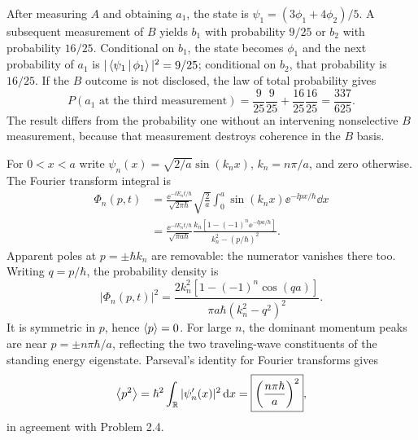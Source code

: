 After measuring $A$ and obtaining $a_1$,
the state is $\psi_1=(3\phi_1+4\phi_2)/5$.
A subsequent measurement of $B$ yields
$b_1$ with probability $9/25$ or $b_2$
with probability $16/25$.
Conditional on $b_1$, the state becomes
$\phi_1$ and the next probability of
$a_1$ is $|\left\langle\psi_1\,\middle|\,\phi_1\right\rangle|^2=9/25$;
conditional on $b_2$, that probability is
$16/25$.
If the $B$ outcome is not disclosed,
the law of total probability gives
\begin{equation}
\boxed{P(a_1\text{ at the third measurement})=
\frac9{25}\frac9{25}+
\frac{16}{25}\frac{16}{25}
=\frac{337}{625}}.
\end{equation}
The result differs from the probability one
without an intervening nonselective $B$ measurement,
because that measurement destroys coherence
in the $B$ basis.

For $0<x<a$ write
$\psi_n(x)=\sqrt{2/a}\sin(k_nx)$,
$k_n=n\pi/a$, and zero otherwise.
The Fourier transform integral is
\begin{align}
\Phi_n(p,t)&=\frac{\ee^{-\ii E_nt/\hbar}}
{\sqrt{2\pi\hbar}}\sqrt{\frac2a}
\int_0^a\sin(k_nx)\ee^{-\ii px/\hbar}\dd x\\
&=\boxed{
\frac{\ee^{-\ii E_nt/\hbar}}{\sqrt{\pi a\hbar}}
\frac{k_n[1-(-1)^n\ee^{-\ii pa/\hbar}]}
{k_n^2-(p/\hbar)^2}}.
\end{align}
Apparent poles at $p=\pm\hbar k_n$ are
removable: the numerator vanishes there too.
Writing $q=p/\hbar$, the probability density is
\begin{equation}
\boxed{|\Phi_n(p,t)|^2=
\frac{2k_n^2[1-(-1)^n\cos(qa)]}
{\pi a\hbar(k_n^2-q^2)^2}}.
\end{equation}
It is symmetric in $p$, hence $\left\langle p\right\rangle=0$.
For large $n$, the dominant momentum peaks
are near $p=\pm n\pi\hbar/a$, reflecting the
two traveling-wave constituents of the standing
energy eigenstate. Parseval's identity for
Fourier transforms gives
\begin{equation}
\left\langle p^2\right\rangle=
\hbar^2\int_{\mathbb R}|\psi_n'(x)|^2\,\mathrm{d} x
=\boxed{\left(\frac{n\pi\hbar}{a}\right)^2},
\end{equation}
in agreement with Problem 2.4.

